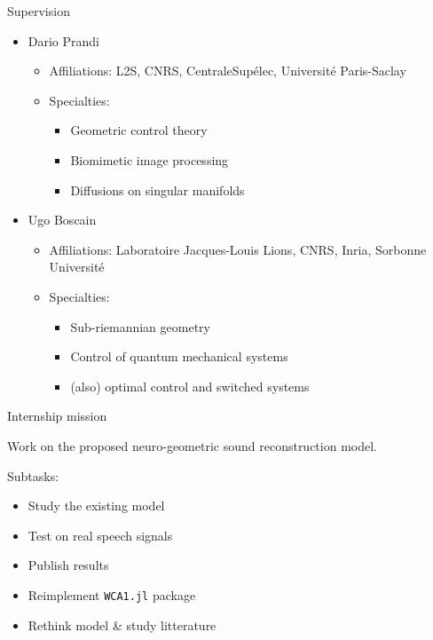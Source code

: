 \documentclass[10pt,american,ignorenonframetext,aspectratio=1610]{beamer}
\providecommand{\tightlist}{%
  \setlength{\itemsep}{0pt}\setlength{\parskip}{0pt}}
\theoremstyle{remark}
\begin{document}
\begin{frame}{Supervision}
\protect\hypertarget{supervision}{}

\begin{itemize}
\tightlist
\item
  Dario Prandi

  \begin{itemize}
  \tightlist
  \item
    Affiliations: L2S, CNRS, CentraleSupélec, Université Paris-Saclay
  \item
    Specialties:

    \begin{itemize}
    \tightlist
    \item
      Geometric control theory
    \item
      Biomimetic image processing
    \item
      Diffusions on singular manifolds
    \end{itemize}
  \end{itemize}
\item
  Ugo Boscain

  \begin{itemize}
  \tightlist
  \item
    Affiliations: Laboratoire Jacques-Louis Lions, CNRS, Inria, Sorbonne
    Université
  \item
    Specialties:

    \begin{itemize}
    \tightlist
    \item
      Sub-riemannian geometry
    \item
      Control of quantum mechanical systems
    \item
      (also) optimal control and switched systems
    \end{itemize}
  \end{itemize}
\end{itemize}

\end{frame}

\begin{frame}[fragile]{Internship mission}
\protect\hypertarget{internship-mission}{}

Work on the proposed neuro-geometric sound reconstruction model.

Subtasks:

\begin{itemize}
\tightlist
\item
  Study the existing model
\item
  Test on real speech signals
\item
  Publish results
\item
  Reimplement \texttt{WCA1.jl} package
\item
  Rethink model \& study litterature
\end{itemize}

\end{frame}
\end{document}
